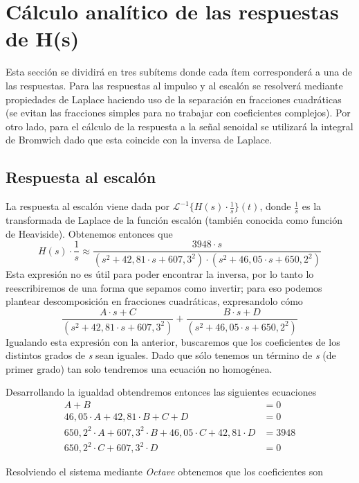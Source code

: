 \documentclass[11pt,a4paper]{report}
\begin{document}
\section*{Cálculo analítico de las respuestas de H(s)}

Esta sección se dividirá en tres subítems donde cada ítem corresponderá a una de las respuestas. Para las respuestas al impulso y al escalón se resolverá mediante propiedades de Laplace haciendo uso de la separación en fracciones cuadráticas (se evitan las fracciones simples para no trabajar con coeficientes complejos). Por otro lado, para el cálculo de la respuesta a la señal senoidal se utilizará la integral de Bromwich dado que esta coincide con la inversa de Laplace.

\subsection*{Respuesta al escalón}
    
La respuesta al escalón viene dada por $\mathcal{L}^{-1}\{H(s) \cdot \frac{1}{s}\}(t)$, donde $\frac{1}{s}$ es la transformada de Laplace de la función escalón (también conocida como función de Heaviside). Obtenemos entonces que
\[H(s) \cdot \frac{1}{s} \approx \frac{3948 \cdot s}{(s^2+42,81 \cdot s + 607,3^2)
\cdot (s^2+46,05 \cdot s + 650,2^2)}\]
Esta expresión no es útil para poder encontrar la inversa, por lo tanto lo reescribiremos de una forma que sepamos como invertir; para eso podemos plantear descomposición en fracciones cuadráticas, expresandolo cómo
\[\frac{A \cdot s + C}{(s^2+42,81 \cdot s + 607,3^2)} + \frac{B \cdot s + D}{(s^2+46,05 \cdot s + 650,2^2)}\]
Igualando esta expresión con la anterior, buscaremos que los coeficientes de los distintos grados de \textit{s} sean iguales. Dado que sólo tenemos un término de \textit{s} (de primer grado) tan solo tendremos una ecuación no homogénea.

\bigskip
Desarrollando la igualdad obtendremos entonces las siguientes ecuaciones
\begin{align*}
A+B&=0 \\
46,05 \cdot A +42,81 \cdot B + C + D &= 0 \\
650,2^2 \cdot A + 607,3^2 \cdot B + 46,05 \cdot C + 42,81 \cdot D &= 3948 \\
650,2^2 \cdot C + 607,3^2 \cdot D &= 0
\end{align*}

Resolviendo el sistema mediante \textit{Octave} obtenemos que los coeficientes son
\end{document}
